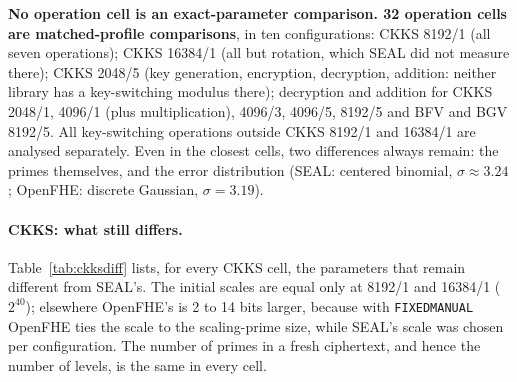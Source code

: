 \documentclass[11pt]{article}
\begin{document}
\textbf{No operation cell is an exact-parameter comparison. 32 operation cells are matched-profile comparisons}, in ten configurations: CKKS 8192/1 (all seven operations); CKKS 16384/1 (all but rotation, which SEAL did not measure there); CKKS 2048/5 (key generation, encryption, decryption, addition: neither library has a key-switching modulus there); decryption and addition for CKKS 2048/1, 4096/1 (plus multiplication), 4096/3, 4096/5, 8192/5 and BFV and BGV 8192/5. All key-switching operations outside CKKS 8192/1 and 16384/1 are analysed separately. Even in the closest cells, two differences always remain: the primes themselves, and the error distribution (SEAL: centered binomial, $\sigma \approx 3.24$; OpenFHE: discrete Gaussian, $\sigma = 3.19$).

\paragraph{CKKS: what still differs.} Table~\ref{tab:ckksdiff} lists, for every CKKS cell, the parameters that remain different from SEAL's. The initial scales are equal only at 8192/1 and 16384/1 ($2^{40}$); elsewhere OpenFHE's is 2 to 14 bits larger, because with \texttt{FIXEDMANUAL} OpenFHE ties the scale to the scaling-prime size, while SEAL's scale was chosen per configuration. The number of primes in a fresh ciphertext, and hence the number of levels, is the same in every cell.

{\footnotesize\setlength{\tabcolsep}{3pt}
}
\vspace{-6pt}
\end{document}
